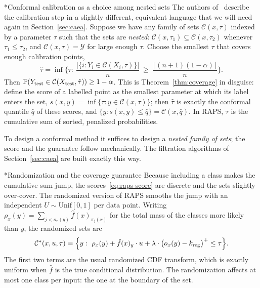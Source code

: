 \documentclass[11pt]{article}
\makeatletter
\theoremstyle{definition}
\renewcommand\subsection{\@startsection{subsection}{2}{\z@}{-3.25ex\@plus -1ex \@minus -.2ex}{1.5ex \@plus .2ex}{\normalfont\large\bfseries\color{secblue}}}
\newcommand{\C}{\mathcal{C}}
\newcommand{\Y}{\mathcal{Y}}
\newcommand{\fhat}{\hat{f}}
\newcommand{\qhat}{\hat{q}}
\newcommand{\Xtest}{X_{\rm test}}
\newcommand{\Ytest}{Y_{\rm test}}
\newcommand{\PP}{\mathbb{P}}
\newcommand{\kreg}{k_{\rm reg}}
\makeatother
\begin{document}
\subsection*{Conformal calibration as a choice among nested sets}
The authors of~\cite{raps} describe the calibration step in a slightly different, equivalent language that we will need again in Section~\ref{sec:caea}. Suppose we have any family of sets $\C(x,\tau)$ indexed by a parameter $\tau$ such that the sets are \emph{nested}: $\C(x,\tau_1)\subseteq\C(x,\tau_2)$ whenever $\tau_1\le\tau_2$, and $\C(x,\tau)=\Y$ for large enough $\tau$. Choose the smallest $\tau$ that covers enough calibration points,
\begin{equation}\label{eq:ccal}
\hat\tau=\inf\Big\{\tau:\ \frac{|\{i:Y_i\in\C(X_i,\tau)\}|}{n}\ \ge\ \frac{\lceil(n+1)(1-\alpha)\rceil}{n}\Big\}.
\end{equation}
Then $\PP(\Ytest\in\C(\Xtest,\hat\tau))\ge1-\alpha$. This is Theorem~\ref{thm:coverage} in disguise: define the score of a labelled point as the smallest parameter at which its label enters the set, $s(x,y)=\inf\{\tau:y\in\C(x,\tau)\}$; then $\hat\tau$ is exactly the conformal quantile $\qhat$ of these scores, and $\{y:s(x,y)\le\qhat\}=\C(x,\qhat)$. In RAPS, $\tau$ is the cumulative sum of sorted, penalized probabilities.

\begin{keybox}
To design a conformal method it suffices to design a \emph{nested family of sets}; the score and the guarantee follow mechanically. The filtration algorithms of Section~\ref{sec:caea} are built exactly this way.
\end{keybox}

\subsection*{Randomization and the coverage guarantee}
Because including a class makes the cumulative sum jump, the scores~\eqref{eq:raps-score} are discrete and the sets slightly over-cover. The randomized version of RAPS smooths the jump with an independent $U\sim\mathrm{Unif}[0,1]$ per data point. Writing $\rho_x(y)=\sum_{j<o_x(y)}\fhat(x)_{\pi_j(x)}$ for the total mass of the classes more likely than $y$, the randomized sets are
\begin{equation}\label{eq:raps-rand}
\C^*(x,u,\tau)=\Big\{y:\ \rho_x(y)+\fhat(x)_y\cdot u+\lambda\cdot\big(o_x(y)-\kreg\big)^+\le\tau\Big\}.
\end{equation}
The first two terms are the usual randomized CDF transform, which is exactly uniform when $\fhat$ is the true conditional distribution. The randomization affects at most one class per input: the one at the boundary of the set.
\end{document}
